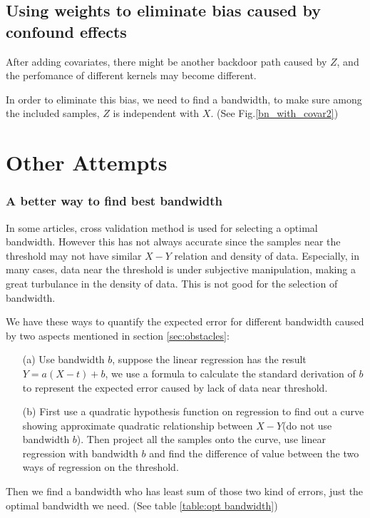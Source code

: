\documentclass[a4 paper,12pt]{article}
\begin{document}
\subsection{Using weights to eliminate bias caused by confound effects}
After adding covariates, there might be another backdoor path caused by $Z$, and the perfomance of different kernels may become different.

In order to eliminate this bias, we need to find a bandwidth, to make sure among the included samples, $Z$ is independent with $X$. (See Fig.\ref{bn_with_covar2})

\section{Other Attempts}
\subsubsection*{A better way to find best bandwidth}

In some articles, cross validation method is used for selecting a optimal bandwidth. However this has not always accurate since the samples near the threshold may not have similar $X-Y$ relation and density of data. Especially, in many cases, data near the threshold is under subjective manipulation, making a great turbulance in the density of data. This is not good for the selection of bandwidth.

We have these ways to quantify the expected error for different bandwidth caused by two aspects mentioned in section \ref{sec:obstacles}:

\begin{enumerate}
   \item[(a)] Use bandwidth $b$, suppose the linear regression has the result $Y=a(X-t)+b$, we use a formula to calculate the standard derivation of $b$ to represent the expected error caused by lack of data near threshold.
   \item[(b)] First use a quadratic hypothesis function on regression to find out a curve showing approximate quadratic relationship between $X-Y$(do not use bandwidth $b$). Then project all the samples onto the curve, use linear regression with bandwidth $b$ and find the difference of value between the two ways of regression on the threshold. 
\end{enumerate}

Then we find a bandwidth who has least sum of those two kind of errors, just the optimal bandwidth we need. (See table \ref{table:opt bandwidth})
\end{document}
